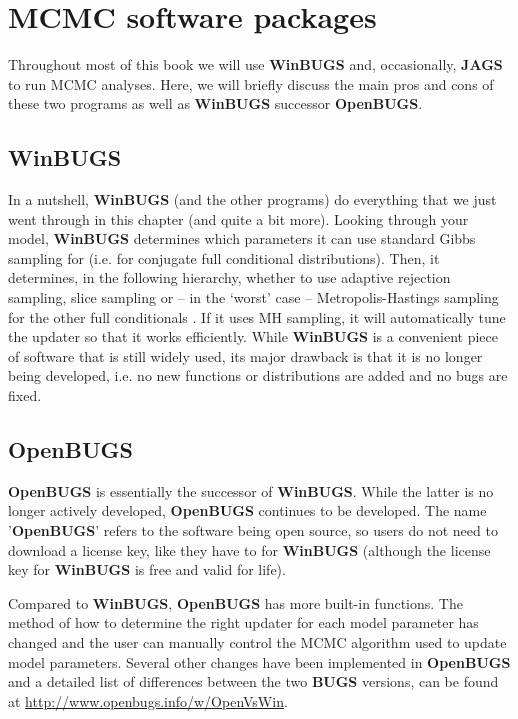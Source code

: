 \section{MCMC software packages}

Throughout most of this book we will use {\bf WinBUGS} and, occasionally, {\bf JAGS} to run MCMC analyses. 
Here, we will briefly discuss the main pros and cons of these two programs 
as well as {\bf WinBUGS} successor {\bf OpenBUGS}. 

\subsection{WinBUGS}

In a nutshell, {\bf WinBUGS} (and the other programs) do everything that we 
just went through in this chapter (and quite a bit more). Looking through 
your model, {\bf WinBUGS} determines which parameters it can use standard 
Gibbs sampling for (i.e. for conjugate full conditional distributions). 
Then, it determines, in the following hierarchy, whether to use adaptive 
rejection sampling, slice sampling or -- in the `worst' case -- 
Metropolis-Hastings sampling for the other full conditionals 
\citep{spiegelhalter_etal:2003}. If it uses MH sampling, it will 
automatically tune the updater so that it works efficiently.
While {\bf WinBUGS} is a convenient piece of software that is still 
widely used, its major drawback is that it is no longer being developed, 
i.e. no new functions or distributions are added and no bugs are fixed.

\subsection{OpenBUGS}
{\bf OpenBUGS} \citep{lunn_etal:2009} is essentially the successor of {\bf WinBUGS}. While the 
latter is
no longer actively developed, {\bf OpenBUGS} continues to be 
developed. The
name '{\bf OpenBUGS}' refers to the software being open source, so users 
do
not need to download a license key, like they have to for {\bf WinBUGS}
(although the license key for {\bf WinBUGS} is free and valid for life).

Compared to {\bf WinBUGS}, {\bf OpenBUGS} 
has  more built-in functions. The
method of how to determine the right updater for each model parameter
has changed and the user can manually control the MCMC algorithm used
to update model parameters.  Several other changes have been
implemented in {\bf OpenBUGS} and a detailed list of differences between the
two {\bf BUGS} versions, can be found at
\url{http://www.openbugs.info/w/OpenVsWin}.

